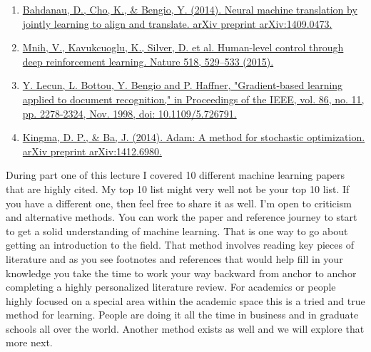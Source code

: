 \documentclass{article}
\begin{document}
\begin{enumerate}
\item \href{https://arxiv.org/pdf/1409.0473.pdf}{Bahdanau, D., Cho, K., \& Bengio, Y. (2014). Neural machine translation by jointly learning to align and translate. arXiv preprint arXiv:1409.0473.} \cite{bahdanau2014neural}
\item \href{https://doi.org/10.1038/nature14236 }{Mnih, V., Kavukcuoglu, K., Silver, D. et al. Human-level control through deep reinforcement learning. Nature 518, 529–533 (2015).} \cite{mnih2015human}
\item \href{http://vision.stanford.edu/cs598_spring07/papers/Lecun98.pdf }{Y. Lecun, L. Bottou, Y. Bengio and P. Haffner, "Gradient-based learning applied to document recognition," in Proceedings of the IEEE, vol. 86, no. 11, pp. 2278-2324, Nov. 1998, doi: 10.1109/5.726791.} \cite{lecun1998gradient}
\item \href{https://arxiv.org/pdf/1412.6980.pdf}{Kingma, D. P., \& Ba, J. (2014). Adam: A method for stochastic optimization. arXiv preprint arXiv:1412.6980.} \cite{kingma2014adam}
\end{enumerate}

During part one of this lecture I covered 10 different machine learning papers that are highly cited. My top 10 list might very well not be your top 10 list. If you have a different one, then feel free to share it as well. I'm open to criticism and alternative methods. You can work the paper and reference journey to start to get a solid understanding of machine learning. That is one way to go about getting an introduction to the field. That method involves reading key pieces of literature and as you see footnotes and references that would help fill in your knowledge you take the time to work your way backward from anchor to anchor completing a highly personalized literature review. For academics or people highly focused on a special area within the academic space this is a tried and true method for learning. People are doing it all the time in business and in graduate schools all over the world. Another method exists as well and we will explore that more next.
\end{document}
